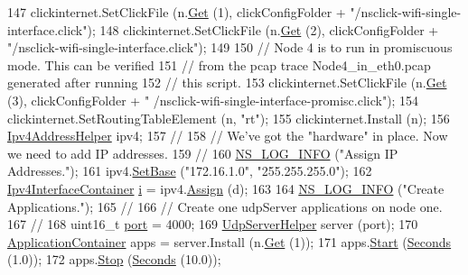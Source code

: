 \begin{DoxyCode}
147   clickinternet.SetClickFile (n.\hyperlink{classns3_1_1NodeContainer_a9ed96e2ecc22e0f5a3d4842eb9bf90bf}{Get} (1), clickConfigFolder + \textcolor{stringliteral}{"/nsclick-wifi-single-interface.click"});
148   clickinternet.SetClickFile (n.\hyperlink{classns3_1_1NodeContainer_a9ed96e2ecc22e0f5a3d4842eb9bf90bf}{Get} (2), clickConfigFolder + \textcolor{stringliteral}{"/nsclick-wifi-single-interface.click"});
149 
150   \textcolor{comment}{// Node 4 is to run in promiscuous mode. This can be verified}
151   \textcolor{comment}{// from the pcap trace Node4\_in\_eth0.pcap generated after running}
152   \textcolor{comment}{// this script.}
153   clickinternet.SetClickFile (n.\hyperlink{classns3_1_1NodeContainer_a9ed96e2ecc22e0f5a3d4842eb9bf90bf}{Get} (3), clickConfigFolder + \textcolor{stringliteral}{"
      /nsclick-wifi-single-interface-promisc.click"});
154   clickinternet.SetRoutingTableElement (n, \textcolor{stringliteral}{"rt"});
155   clickinternet.Install (n);
156   \hyperlink{classns3_1_1Ipv4AddressHelper}{Ipv4AddressHelper} ipv4;
157   \textcolor{comment}{//}
158   \textcolor{comment}{// We've got the "hardware" in place.  Now we need to add IP addresses.}
159   \textcolor{comment}{//}
160   \hyperlink{group__logging_gafbd73ee2cf9f26b319f49086d8e860fb}{NS\_LOG\_INFO} (\textcolor{stringliteral}{"Assign IP Addresses."});
161   ipv4.\hyperlink{classns3_1_1Ipv4AddressHelper_acf7b16dd25bac67e00f5e25f90a9a035}{SetBase} (\textcolor{stringliteral}{"172.16.1.0"}, \textcolor{stringliteral}{"255.255.255.0"});
162   \hyperlink{classns3_1_1Ipv4InterfaceContainer}{Ipv4InterfaceContainer} \hyperlink{bernuolliDistribution_8m_a6f6ccfcf58b31cb6412107d9d5281426}{i} = ipv4.\hyperlink{classns3_1_1Ipv4AddressHelper_af8e7f4a1a7e74c00014a1eac445a27af}{Assign} (d);
163 
164   \hyperlink{group__logging_gafbd73ee2cf9f26b319f49086d8e860fb}{NS\_LOG\_INFO} (\textcolor{stringliteral}{"Create Applications."});
165   \textcolor{comment}{//}
166   \textcolor{comment}{// Create one udpServer applications on node one.}
167   \textcolor{comment}{//}
168   uint16\_t \hyperlink{dsdv-manet_8cc_a8e0798404bf2cf5dabb84c5ba9a4f236}{port} = 4000;
169   \hyperlink{classns3_1_1UdpServerHelper}{UdpServerHelper} server (port);
170   \hyperlink{classns3_1_1ApplicationContainer}{ApplicationContainer} apps = server.Install (n.\hyperlink{classns3_1_1NodeContainer_a9ed96e2ecc22e0f5a3d4842eb9bf90bf}{Get} (1));
171   apps.\hyperlink{classns3_1_1ApplicationContainer_a8eff87926507020bbe3e1390358a54a7}{Start} (\hyperlink{group__timecivil_ga33c34b816f8ff6628e33d5c8e9713b9e}{Seconds} (1.0));
172   apps.\hyperlink{classns3_1_1ApplicationContainer_adfc52f9aa4020c8714679b00bbb9ddb3}{Stop} (\hyperlink{group__timecivil_ga33c34b816f8ff6628e33d5c8e9713b9e}{Seconds} (10.0));

\end{DoxyCode}
